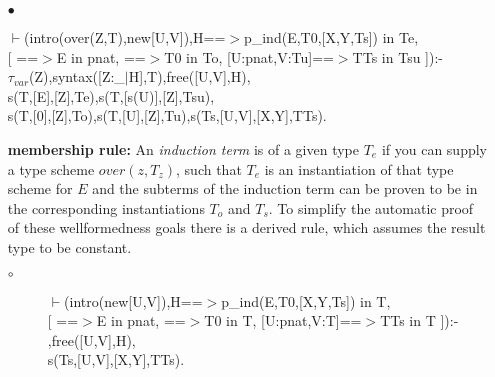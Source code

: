 \documentclass[11pt]{report}
\begin{document}
\begin{enumerate}
  
 \item[$\bullet$]
\begin{sf}\begin{tabbing}
$\vdash$(intro(over(Z,T),new[U,V]),H==$>$p\_\hspace{0.1em}ind(E,T0,[X,Y,Ts]) in Te,\\[-0.15ex]
\hspace{2em}[ ==$>$E in pnat, ==$>$T0 in To, [U:pnat,V:Tu]==$>$TTs in Tsu ]):-\\[-0.15ex]
\hspace{2em}$\tau_{var}$(Z),syntax([Z:\_\hspace{0.1em}$\mid$H],T),free([U,V],H),\\[-0.15ex]
\hspace{2em}s(T,[E],[Z],Te),s(T,[s(U)],[Z],Tsu),\\[-0.15ex]
\hspace{2em}s(T,[0],[Z],To),s(T,[U],[Z],Tu),s(Ts,[U,V],[X,Y],TTs). 
\end{tabbing}\end{sf}

 {\bf membership rule:}
 An \emph{induction term} is of a given type $T_e$ if you can
 supply a type scheme $over(z,T_z)$, such that $T_e$ is an
 instantiation of that type scheme for $E$ and the subterms of
 the induction term can be proven to be in the corresponding
 instantiations $T_o$ and $T_s$. To simplify
 the automatic proof of these wellformedness goals there is
 a derived rule, which assumes the result type to be constant.
 \begin{description}
 \item[$\circ$]
\begin{sf}\begin{tabbing}
$\vdash$(intro(new[U,V]),H==$>$p\_\hspace{0.1em}ind(E,T0,[X,Y,Ts]) in T,\\[-0.15ex]
\hspace{2em}[ ==$>$E in pnat, ==$>$T0 in T, [U:pnat,V:T]==$>$TTs in T ]):-\\[-0.15ex]
\hspace{2em}{\bf derived},free([U,V],H),\\[-0.15ex]
\hspace{2em}s(Ts,[U,V],[X,Y],TTs).
\end{tabbing}\end{sf}


\end{description}
\end{enumerate}
\end{document}
